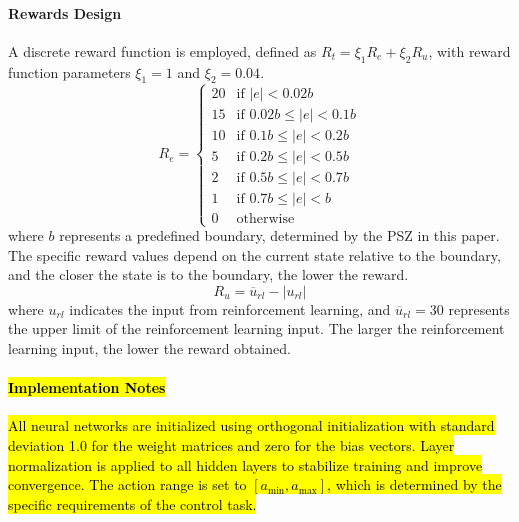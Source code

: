\documentclass[preprint,12pt]{elsarticle}
\begin{document}
\paragraph{Rewards Design}
A discrete reward function is employed, defined as \(R_t = \xi_1 R_e + \xi_2 R_u\), with reward function parameters \(\xi_1 = 1\) and \(\xi_2 = 0.04\).
\[
    R_e = \begin{cases} 
    20 & \text{if } |e| < 0.02 b \\
    15 & \text{if } 0.02 b \leq |e| < 0.1 b \\
    10 & \text{if } 0.1 b \leq |e| < 0.2 b \\
    5 & \text{if } 0.2 b \leq |e| < 0.5 b \\
    2 & \text{if } 0.5 b \leq |e| < 0.7 b \\
    1 & \text{if } 0.7 b \leq |e| < b \\
    0 & \text{otherwise}
    \end{cases}
\]
where \(b\) represents a predefined boundary, determined by the PSZ in this paper. The specific reward values depend on the current state relative to the boundary, and the closer the state is to the boundary, the lower the reward.
\[R_u = \overline{u}_{rl} - |u_{rl}|\]
where \(u_{rl}\) indicates the input from reinforcement learning, and \(\overline{u}_{rl} = 30\) represents the upper limit of the reinforcement learning input. The larger the reinforcement learning input, the lower the reward obtained.

\paragraph{\hl{Implementation Notes}}
\hl{All neural networks are initialized using orthogonal initialization with standard deviation 1.0 for the weight matrices and zero for the bias vectors. Layer normalization is applied to all hidden layers to stabilize training and improve convergence. The action range is set to $[a_{\text{min}}, a_{\text{max}}]$, which is determined by the specific requirements of the control task.}
\end{document}
